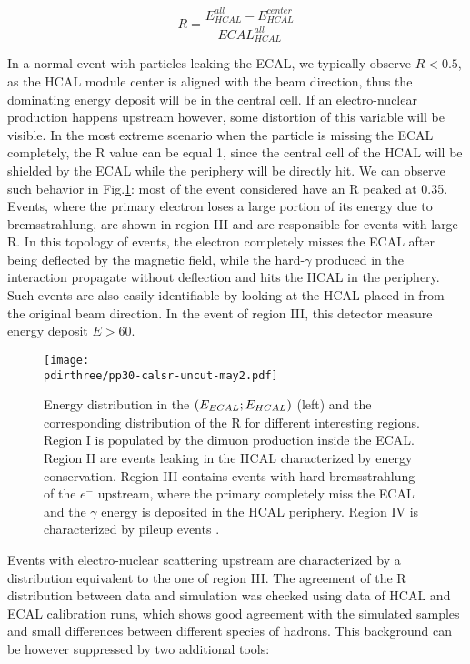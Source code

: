\begin{equation}
  \label{eq:R-factor}
  R = \frac{E^{all}_{HCAL} - E^{center}_{HCAL}}{ECAL^{all}_{HCAL}}
\end{equation}

In a normal event with particles leaking the ECAL, we typically observe $R<0.5$, as the HCAL module center is aligned with the beam direction, thus the dominating energy deposit will be in the central cell. If an electro-nuclear production happens upstream however, some distortion of this variable will be visible. In the most extreme scenario when the particle is missing the ECAL completely, the R value can be equal 1, since the central cell of the HCAL will be shielded by the ECAL while the periphery will be directly hit. We can observe such behavior in Fig.\ref{fig:r-value-csample}: most of the event considered have an R peaked at 0.35. Events, where the primary electron loses a large portion of its energy due to bremsstrahlung, are shown in region III and are responsible for events with large R. In this topology of events, the electron completely misses the ECAL after being deflected by the magnetic field, while the hard-$\gamma$ produced in the interaction propagate without deflection and hits the HCAL in the periphery. Such events are also easily identifiable by looking at the HCAL placed in from the original beam direction. In the event of region III, this detector measure energy deposit $E>60$\gev.

\begin{figure}[bth!]
  \centering
  \texttt{[image: \\pdirthree/pp30-calsr-uncut-may2.pdf]}
  \caption[R value for control sample]{Energy distribution in the $(E_{ECAL};E_{HCAL})$ (left) and the corresponding distribution of the R for different interesting regions. Region I is populated by the dimuon production inside the ECAL. Region II are events leaking in the HCAL characterized by energy conservation. Region III contains events with hard bremsstrahlung of the $e^-$ upstream, where the primary completely miss the ECAL and the $\gamma$ energy is deposited in the HCAL periphery. Region IV is characterized by pileup events \cite{pdegen-thesis}.}
  \label{fig:r-value-csample}
\end{figure}

Events with electro-nuclear scattering upstream are characterized by a distribution equivalent to the one of region III. The agreement of the R distribution between data and simulation was checked using data of HCAL and ECAL calibration runs, which shows good agreement with the simulated samples and small differences between different species of hadrons. This background can be however suppressed by two additional tools:

